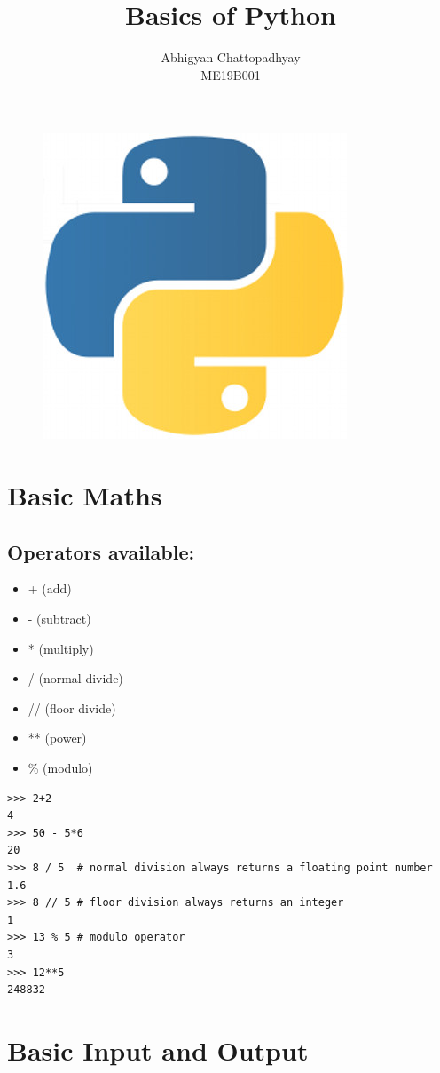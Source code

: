 \documentclass[12pt,a4paper]{article}
\author{Abhigyan Chattopadhyay\\
ME19B001}
\title{Basics of Python}
\begin{document}
\maketitle
\begin{figure}[h]
\begin{center}
\includegraphics[scale=0.1]{python_img}
\end{center}
\end{figure}

\section{Basic Maths}
\subsection{Operators available:}
\begin{itemize}
\item + (add)
\item - (subtract)
\item * (multiply)
\item / (normal divide)
\item // (floor divide)
\item ** (power)
\item \% (modulo)
\end{itemize}

\begin{lstlisting}
>>> 2+2
4
>>> 50 - 5*6
20
>>> 8 / 5  # normal division always returns a floating point number
1.6
>>> 8 // 5 # floor division always returns an integer
1
>>> 13 % 5 # modulo operator
3
>>> 12**5
248832
\end{lstlisting}

\section{Basic Input and Output}
\end{document}
